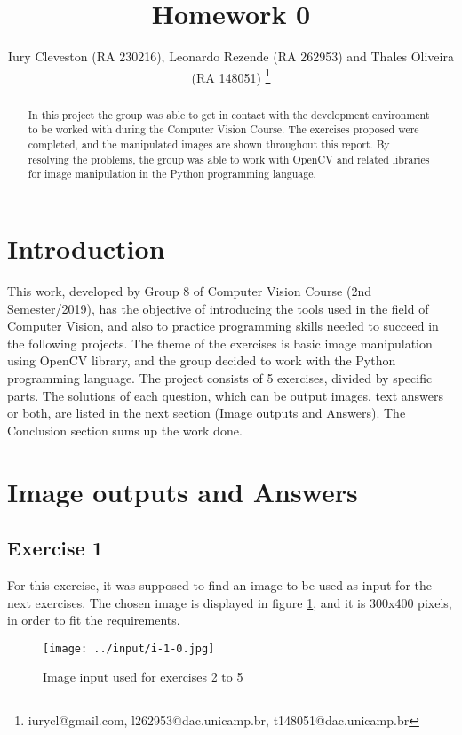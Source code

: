 \documentclass[]{IEEEtran}
\begin{document}
  \title{Homework 0}
  \author{Iury Cleveston (RA 230216), Leonardo Rezende (RA 262953) and Thales Oliveira (RA 148051)
    \thanks{iurycl@gmail.com, l262953@dac.unicamp.br, t148051@dac.unicamp.br}
  }

  \maketitle
  
  \begin{abstract}
    In this project the group was able to get in contact with the development environment to be worked with during the Computer Vision Course. The exercises proposed were completed, and the manipulated images are shown throughout this report. By resolving the problems, the group was able to work with OpenCV and related libraries for image manipulation in the Python programming language.
  \end{abstract}
  
  \section{Introduction}
  
  This work, developed by Group 8 of Computer Vision Course (2nd Semester/2019), has the objective of introducing the tools used in the field of Computer Vision, and also to practice programming skills needed to succeed in the following projects. The theme of the exercises is basic image manipulation using OpenCV library, and the group decided to work with the Python programming language. The project consists of 5 exercises, divided by specific parts. The solutions of each question, which can be output images, text answers or both, are listed in the next section (Image outputs and Answers). The Conclusion section sums up the work done. 


  \section{Image outputs and Answers}
  \subsection{Exercise 1}
  For this exercise, it was supposed to find an image to be used as input for the next exercises. The chosen image is displayed in figure \ref{fig:i-1-0}, and it is 300x400 pixels, in order to fit the requirements.
  \begin{figure}[!h]
    \centering
    \texttt{[image: ../input/i-1-0.jpg]}
    \caption{Image input used for exercises 2 to 5}
    \label{fig:i-1-0}
  \end{figure}
  
\end{document}

